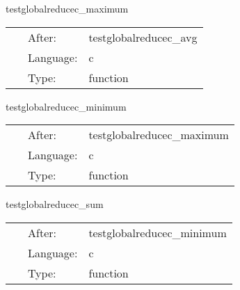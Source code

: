 \vspace{5mm}


\hspace{5mm} testglobalreducec\_maximum 

\hspace{5mm}{\it test out maximum reduction } 


\hspace{5mm}

 \begin{tabular*}{160mm}{cll} 
~ & After:  & testglobalreducec\_avg \\ 
~ & Language:  & c \\ 
~ & Type:  & function \\ 
\end{tabular*} 


\vspace{5mm}


\hspace{5mm} testglobalreducec\_minimum 

\hspace{5mm}{\it test out minimum reduction } 


\hspace{5mm}

 \begin{tabular*}{160mm}{cll} 
~ & After:  & testglobalreducec\_maximum \\ 
~ & Language:  & c \\ 
~ & Type:  & function \\ 
\end{tabular*} 


\vspace{5mm}


\hspace{5mm} testglobalreducec\_sum 

\hspace{5mm}{\it test out sum reduction } 


\hspace{5mm}

 \begin{tabular*}{160mm}{cll} 
~ & After:  & testglobalreducec\_minimum \\ 
~ & Language:  & c \\ 
~ & Type:  & function \\ 
\end{tabular*} 


